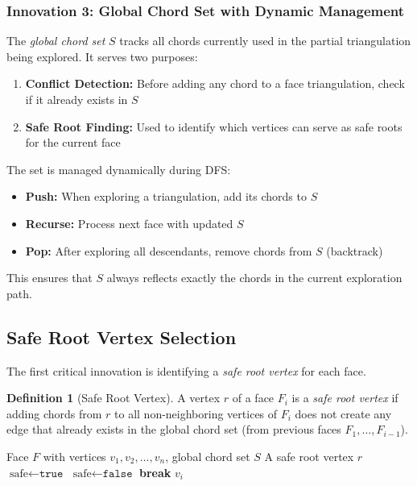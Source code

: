 \documentclass[12pt,a4paper]{article}
\theoremstyle{definition}
\newtheorem{definition}{Definition}
\theoremstyle{remark}
\begin{document}
\subsubsection{Innovation 3: Global Chord Set with Dynamic Management}

The \emph{global chord set} $S$ tracks all chords currently used in the partial triangulation being explored. It serves two purposes:

\begin{enumerate}
    \item \textbf{Conflict Detection:} Before adding any chord to a face triangulation, check if it already exists in $S$
    \item \textbf{Safe Root Finding:} Used to identify which vertices can serve as safe roots for the current face
\end{enumerate}

The set is managed dynamically during DFS:
\begin{itemize}
    \item \textbf{Push:} When exploring a triangulation, add its chords to $S$
    \item \textbf{Recurse:} Process next face with updated $S$
    \item \textbf{Pop:} After exploring all descendants, remove chords from $S$ (backtrack)
\end{itemize}

This ensures that $S$ always reflects exactly the chords in the current exploration path.

\subsection{Safe Root Vertex Selection}

The first critical innovation is identifying a \emph{safe root vertex} for each face.

\begin{definition}[Safe Root Vertex]
A vertex $r$ of a face $F_i$ is a \emph{safe root vertex} if adding chords from $r$ to all non-neighboring vertices of $F_i$ does not create any edge that already exists in the global chord set (from previous faces $F_1, \ldots, F_{i-1}$).
\end{definition}

\begin{algorithm}
\caption{Finding a Safe Root Vertex}
\label{alg:safe_root}
\begin{algorithmic}[1]
\Require Face $F$ with vertices $v_1, v_2, \ldots, v_n$, global chord set $S$
\Ensure A safe root vertex $r$
    \State $\text{safe} \gets \texttt{true}$
            \State $\text{safe} \gets \texttt{false}$
            \State \textbf{break}
        \EndIf
    \EndFor
        \State \Return $v_i$
    \EndIf
\EndFor
\end{algorithmic}
\end{algorithm}
\end{document}
